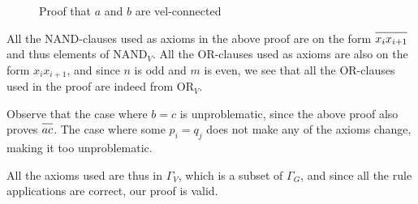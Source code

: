 \begin{figure}[h!]
  \begin{prooftree*}
  \end{prooftree*}
  \caption{Proof that $a$ and $b$ are vel-connected}
  \label{fig:general_vel_proof}
\end{figure}

All the NAND-clauses used as axioms in the above proof are on the form $\ol{x_ix_{i+1}}$ and thus elements of $\text{NAND}_V$.
All the OR-clauses used as axioms are also on the form $x_ix_{i+1}$, and since $n$ is odd and $m$ is even, we see that all the OR-clauses used in the proof are indeed from $\text{OR}_V$.

Observe that the case where $b = c$ is unproblematic, since the above proof also proves $\ol{ac}$.
The case where some $p_i = q_j$ does not make any of the axioms change, making it too unproblematic.

All the axioms used are thus in $\Gamma_V$, which is a subset of $\Gamma_G$, and since all the rule applications are correct, our proof is valid.
